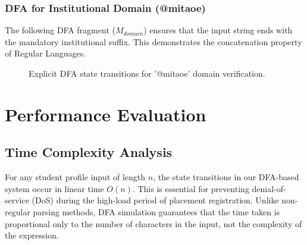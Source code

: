\documentclass[12pt,a4paper]{article}
\begin{document}
\subsubsection{DFA for Institutional Domain (@mitaoe)}
The following DFA fragment ($M_{domain}$) ensures that the input string ends with the mandatory institutional suffix. This demonstrates the concatenation property of Regular Languages.

\begin{figure}[H]
\centering
{}
\caption{Explicit DFA state transitions for '@mitaoe' domain verification.}
\end{figure}

\newpage

\section{Performance Evaluation}

\subsection{Time Complexity Analysis}
For any student profile input of length $n$, the state transitions in our DFA-based system occur in linear time $O(n)$. This is essential for preventing denial-of-service (DoS) during the high-load period of placement registration. Unlike non-regular parsing methods, DFA simulation guarantees that the time taken is proportional only to the number of characters in the input, not the complexity of the expression.
\end{document}
